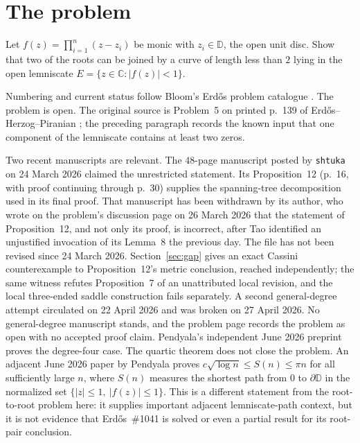 \documentclass[11pt]{article}
\newcommand{\dbar}{\mathbb{D}}
\begin{document}
\section{The problem}\label{sec:problem}

\begin{problem}[Erd\H{o}s \#1041]\label{res:problem}
Let $f(z)=\prod_{i=1}^{n}(z-z_i)$ be monic with $z_i\in\dbar$, the open unit
disc.  Show that two of the roots can be joined by a curve of length less than
$2$ lying in the open lemniscate $E=\{z\in\mathbb{C}:|f(z)|<1\}$.
\end{problem}

\noindent Numbering and current status follow Bloom's Erd\H{o}s problem
catalogue \cite{bloom}.
The problem is open.  The original source is Problem~5 on printed p.~139 of
Erd\H{o}s--Herzog--Piranian \cite[p.~139]{ehp1958}; the preceding paragraph records the
known input that one component of the lemniscate contains at least two zeros.

Two recent manuscripts are relevant.  The 48-page manuscript posted by
\texttt{shtuka} on 24 March 2026
\cite[Theorem~1, p.~1]{march2026} claimed the unrestricted
statement.  Its Proposition~12 (p.~16, with proof continuing through p.~30)
supplies the spanning-tree decomposition used in its final proof.  That
manuscript has been withdrawn by its author, who wrote on the problem's
discussion page on 26 March 2026 that the statement of Proposition~12, and not
only its proof, is incorrect, after Tao identified an unjustified invocation of
its Lemma~8 the previous day.  The file has not been revised since 24 March
2026.  Section~\ref{sec:gap} gives an exact Cassini counterexample to
Proposition~12's metric conclusion, reached independently; the same witness
refutes Proposition~7 of an unattributed local revision, and the local
three-ended saddle construction fails separately.  A second general-degree
attempt circulated on 22 April 2026 and was broken on 27 April 2026.  No
general-degree manuscript stands, and the problem page records the problem as
open with no accepted proof claim.  Pendyala's independent June 2026
preprint \cite[Thm.~1, p.~1]{june2026} proves the degree-four case.  The quartic theorem does
not close the problem.  An adjacent June 2026 paper by Pendyala
\cite[Thm.~1.2, p.~2; introductory discussion, pp.~1--2]{pendyala2026shortest}
proves $c\sqrt{\log n}\leq S(n)\leq\pi n$ for all sufficiently large $n$,
where $S(n)$ measures the shortest path from $0$ to $\partial\mathbb D$ in
the normalized set $\{|z|\leq1,\ |f(z)|\leq1\}$.  This is a different
statement from the root-to-root problem here: it supplies important adjacent
lemniscate-path context, but it is not evidence that Erd\H{o}s~\#1041 is
solved or even a partial result for its root-pair conclusion.
\end{document}
